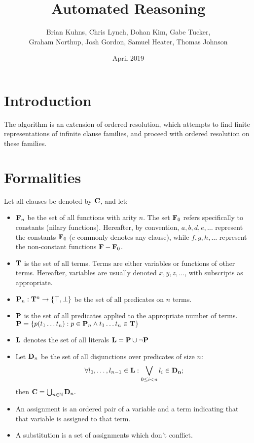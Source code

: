 \documentclass{article}
\title{Automated Reasoning}
\author{
	Brian Kuhns,
	Chris Lynch,
	Dohan Kim,
	Gabe Tucker, \\
	Graham Northup,
	Josh Gordon,
	Samuel Heater,
	Thomas Johnson
  }
\date{April 2019}
\newcommand{\allclauses}[0]{{\bf C}}
\newcommand{\allvars}[0]{{\bf V}}
\newcommand{\allpreds}[0]{{\bf P}}
\newcommand{\allliterals}[0]{{\bf L}}
\newcommand{\allterms}[0]{{\bf T}}
\newcommand{\allfuncs}[0]{{\bf F}}
\newcommand{\constfuncs}[0]{\allfuncs_0}
\newcommand{\true}[0]{\top}
\newcommand{\false}[0]{\bot}
\newcommand{\nat}[0]{{\mathbb N}}
\begin{document}
\maketitle

\section{Introduction}


The algorithm is an extension of ordered resolution,
which attempts to find finite representations of infinite clause families,
and proceed with ordered resolution on these families.

\section{Formalities}

Let all clauses be denoted by $\allclauses$, and let:
\begin{itemize}
	\item $\allfuncs_n$ be the set of all functions with arity $n$.  The set $\constfuncs$ refers specifically to constants (nilary functions). Hereafter, by convention, $a, b, d, e, \ldots$ represent the constants $\constfuncs$ ($c$ commonly denotes any clause), while $f, g, h, \ldots$ represent the non-constant functions $\allfuncs - \constfuncs$.
	\item $\allterms$ is the set of all terms. Terms are either variables or functions of other terms. Hereafter, variables are usually denoted $x, y, z, \ldots$, with subscripts as appropriate.
	\item $\allpreds_n : \allterms^n \rightarrow \{\true,\false\}$ be the set of all predicates on $n$ terms. %
  \item $\allpreds$ is the set of all predicates applied to the appropriate number of terms. $\allpreds = \{ p(t_1 \ldots t_n) : p \in \allpreds_n \land t_1 \ldots t_n \in \allterms \}$
  \item $\allliterals$ denotes the set of all literals $\allliterals = \allpreds \cup \neg \allpreds$
	\item Let ${\bf D}_n$ be the set of all disjunctions over predicates of size $n$:
		$$
    \forall l_0,\ldots,l_{n-1} \in \allliterals: \bigvee_{0 \leq i < n} l_i \in \bf D_n;
		$$
		then $\allclauses = \bigcup_{n \in \nat} {\bf D}_n.$
  \item An assignment is an ordered pair of a variable and a term indicating that that variable is assigned to that term.
  \item A substitution is a set of assignments which don't conflict.
\end{itemize}
\end{document}
